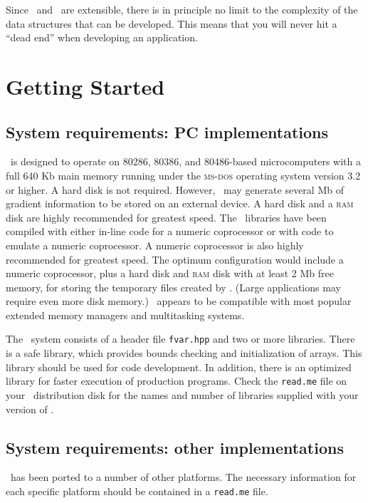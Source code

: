 \documentclass{admbmanual}
\begin{document}
Since \cplus\ and \scAD\ are extensible, there is in principle no limit to the
complexity of the data structures that can be developed. This means that you
will never hit a ``dead end'' when developing an application.


\chapter{Getting Started}

\section{System requirements: PC implementations}

\scAD\ is designed to operate on 80286, 80386, and 80486-based microcomputers
with a full 640 Kb main memory running under the \textsc{ms-dos} operating
system version 3.2 or higher. A hard disk is not required. However, \scAD\ may
generate several Mb of gradient information to be stored on an external device.
A hard disk and a \textsc{ram} disk are highly recommended for greatest speed.
The \scAD\ libraries have been compiled with either in-line code for a numeric
coprocessor or with code to emulate a numeric coprocessor. A numeric coprocessor
is also highly recommended for greatest speed. The optimum configuration would
include a numeric coprocessor, plus a hard disk and \textsc{ram} disk with at
least 2 Mb free memory, for storing the temporary files created by \scAD. (Large
applications may require even more disk memory.) \scAD\ appears to be compatible
with most popular extended memory managers and multitasking systems.

The \scAD\ system consists of a header file \texttt{fvar.hpp} and two or more
libraries. There is a safe library, which provides bounds checking and
initialization of arrays. This library should be used for code development. In
addition, there is an optimized library for faster execution of production
programs. Check the \texttt{read.me} file on your \scAD\ distribution disk for
the names and number of libraries supplied with your version of \scAD.

\section{System requirements: other implementations}

\scAD\ has been ported to a number of other platforms. The necessary information
for each specific platform should be contained in a \texttt{read.me} file.
\end{document}
